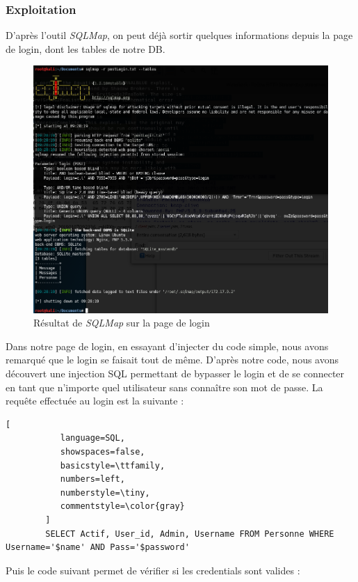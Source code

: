 \documentclass[12pt]{article}
\begin{document}
\subsubsection{Exploitation}
D'après l'outil \textit{SQLMap}, on peut déjà sortir quelques informations depuis la page de login, dont les tables de notre DB. 

\begin{figure}[H]
\centering
\includegraphics[width=\linewidth]{images/sqli.png}
\caption{Résultat de \textit{SQLMap} sur la page de login}
\end{figure}

Dans notre page de login, en essayant d'injecter du code simple, nous avons remarqué que le login se faisait tout de même. D'après notre code, nous avons découvert une injection SQL permettant de bypasser le login et de se connecter en tant que n'importe quel utilisateur sans connaître son mot de passe. La requête effectuée au login est la suivante :

\begin{lstlisting}[
           language=SQL,
           showspaces=false,
           basicstyle=\ttfamily,
           numbers=left,
           numberstyle=\tiny,
           commentstyle=\color{gray}
        ]
        SELECT Actif, User_id, Admin, Username FROM Personne WHERE Username='$name' AND Pass='$password'
\end{lstlisting}

Puis le code suivant permet de vérifier si les credentials sont valides : 
\end{document}
